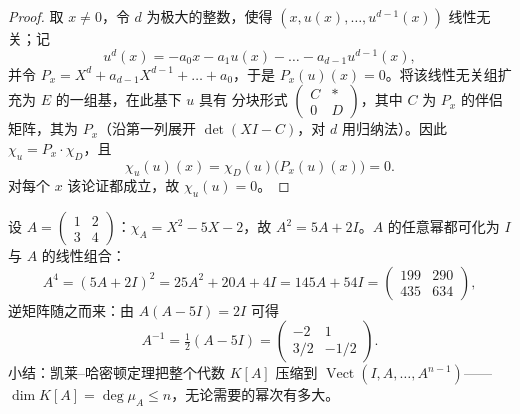 \begin{proof}
取 $x \neq 0$，令 $d$ 为极大的整数，使得 $(x, u(x), \dots,
u^{d-1}(x))$ 线性无关；记
\[
u^d(x) = -a_0 x - a_1 u(x) - \dots - a_{d-1}u^{d-1}(x),
\]
并令 $P_x = X^d + a_{d-1}X^{d-1} + \dots + a_0$，于是 $P_x(u)(x) =
0$。将该线性无关组扩充为 $E$ 的一组基，在此基下 $u$ 具有
分块形式 $\begin{pmatrix} C & \ast\\ 0 & D\end{pmatrix}$，其中 $C$
为 $P_x$ 的伴侣矩阵，其为
$P_x$（沿第一列展开 $\det(XI - C)$，对
$d$ 用归纳法）。因此 $\chi_u = P_x \cdot \chi_D$，且
\[
\chi_u(u)(x) = \chi_D(u)\bigl(P_x(u)(x)\bigr) = 0 .
\]
对每个 $x$ 该论证都成立，故 $\chi_u(u) = 0$。
\end{proof}

\begin{example}[凯莱--哈密顿定理的应用]\label{ex:b2:reduction:chwork}
设 $A = \begin{pmatrix} 1 & 2\\ 3 & 4\end{pmatrix}$：$\chi_A = X^2 -
5X - 2$，故 $A^2 = 5A + 2I$。$A$ 的任意幂都可化为
$I$ 与 $A$ 的线性组合：
\[
A^4 = (5A + 2I)^2 = 25A^2 + 20A + 4I = 145A + 54I =
\begin{pmatrix} 199 & 290\\ 435 & 634\end{pmatrix},
\]
逆矩阵随之而来：由 $A(A - 5I) = 2I$ 可得
\[
A^{-1} = \tfrac12(A - 5I)
= \begin{pmatrix} -2 & 1\\ 3/2 & -1/2\end{pmatrix}.
\]
小结：凯莱--哈密顿定理把整个代数
$K[A]$ 压缩到 $\operatorname{Vect}(I, A, \dots, A^{n-1})$——
$\dim K[A] = \deg\mu_A \leq n$，无论需要的幂次有多大。
\end{example}

